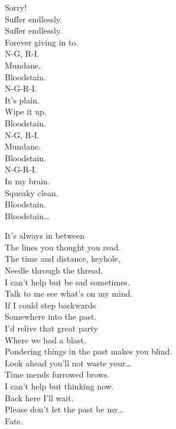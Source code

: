 Sorry! \\

Suffer endlessly. \\
Suffer endlessly. \\
Forever giving in to. \\

N-G, R-I. \\
Mundane. \\
Bloodstain. \\
N-G-R-I. \\
It's plain. \\
Wipe it up. \\
Bloodstain. \\

N-G, R-I. \\
Mundane. \\
Bloodstain. \\
N-G-R-I. \\
In my brain. \\
Squeaky clean. \\
Bloodstain. \\

Bloodstain… \\




It's always in between \\
The lines you thought you read. \\
The time and distance, keyhole, \\
Needle through the thread. \\
I can't help but be sad sometimes. \\
Talk to me see what's on my mind. \\

If I could step backwards \\
Somewhere into the past. \\
I'd relive that great party \\
Where we had a blast. \\
Pondering things in the past makes you blind. \\
Look ahead you'll not waste your… \\

Time mends furrowed brows. \\
I can't help but thinking now. \\
Back here I'll wait. \\
Please don't let the past be my… \\
Fate. \\

